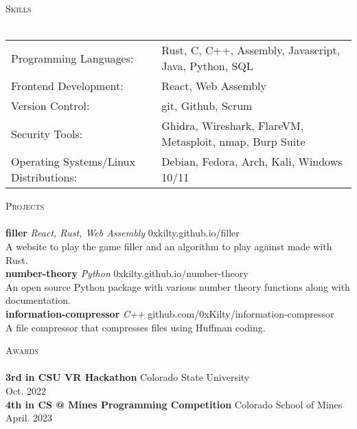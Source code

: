 \documentclass[a4paper]{article}
\newcommand{\lineunder} {
    \vspace*{-8pt} \\
    \hspace*{-18pt} \hrulefill \\
}
\newcommand{\header} [1] {
    {\hspace*{-18pt}\vspace*{6pt} \textsc{#1}}
    \vspace*{-6pt} \lineunder
}
\begin{document}
\header{Skills}
\begin{tabular}{ l l }
	Programming Languages:                 & Rust, C, C++, Assembly, Javascript, Java, Python, SQL\\
	Frontend Development:                  & React, Web Assembly \\
	Version Control:                       & git, Github, Scrum \\
    Security Tools:                        & Ghidra, Wireshark, FlareVM, Metasploit, nmap, Burp Suite \\
	Operating Systems/Linux Distributions: & Debian, Fedora, Arch, Kali, Windows 10/11 \\
\end{tabular}
\vspace{2mm}

\header{Projects}
{\textbf{filler}} {\sl React, Rust, Web Assembly} \hfill 0xkilty.github.io/filler\\
A website to play the game \textquotedbl{}filler\textquotedbl{} and an algorithm to play against made with Rust.\\
\vspace*{2mm}
{\textbf{number-theory}} {\sl Python} \hfill 0xkilty.github.io/number-theory\\
An open source Python package with various number theory functions along with documentation.\\
\vspace*{2mm}
{\textbf{information-compressor}} {\sl C++} \hfill github.com/0xKilty/information-compressor\\
A file compressor that compresses files using Huffman coding.\\
\vspace*{2mm}

\header{Awards}
\textbf{3rd in CSU VR Hackathon} \hfill Colorado State University\\
\hfill Oct. 2022\\
\vspace*{2mm}
\textbf{4th in CS @ Mines Programming Competition} \hfill Colorado School of Mines\\
\hfill April. 2023\\
\vspace*{2mm}
\end{document}
